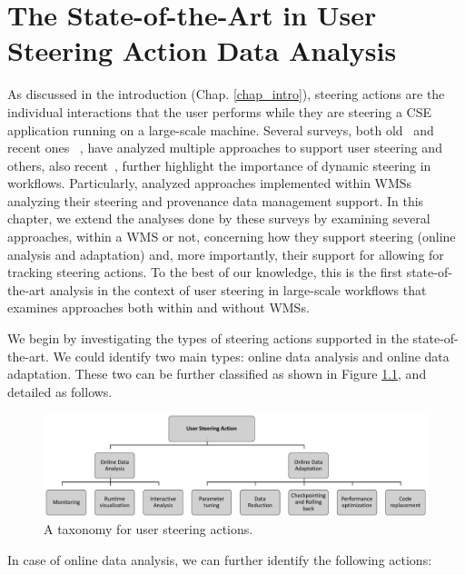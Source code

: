 \chapter{The State-of-the-Art in User Steering Action Data Analysis}
\label{chap3}

As discussed in the introduction (Chap. \ref{chap_intro}), steering actions are the individual interactions that the user performs while they are steering a CSE application running on a large-scale machine.
Several surveys, both old~\cite{MulderSurvey,Xian2008Computational} and recent ones~ \cite{Ayachit2016Performance, Bauer2016In}, have analyzed multiple approaches to support user steering and others, also recent~\cite{deelman_future_2017,Mattoso2015Dynamic,F.daSilva2017characterization,Atkinson2017Scientific,Netto2018HPC}, further highlight the importance of dynamic steering in workflows.
Particularly, \citet{Mattoso2015Dynamic}
  analyzed approaches implemented within WMSs analyzing their steering and provenance data management support.
In this chapter, we extend the analyses done by these surveys by examining several approaches, within a WMS or not, concerning how they support steering (online analysis and adaptation) and, more importantly, their support for allowing for tracking steering actions.
To the best of our knowledge, this is the first state-of-the-art analysis in the context of user steering in large-scale workflows that examines approaches both within and without WMSs.

We begin by investigating the types of steering actions supported in the state-of-the-art. We could identify two main types: online data analysis and online data adaptation. These two can be further classified as shown in Figure \ref{fig:chap3_taxonomy}, and detailed as follows.

\begin{figure}[H]
    \centering
    \includegraphics[width=\textwidth,keepaspectratio]{img/taxonomy-chap3.pdf}
    \caption{A taxonomy for user steering actions.}
    \label{fig:chap3_taxonomy}
\end{figure}


In case of online data analysis, we can further identify the following actions:

